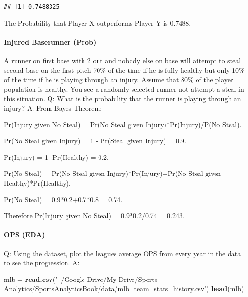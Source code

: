 \documentclass[]{article}
\newenvironment{Shaded}{\begin{snugshade}}{\end{snugshade}}
\newcommand{\KeywordTok}[1]{\textcolor[rgb]{0.13,0.29,0.53}{\textbf{#1}}}
\newcommand{\NormalTok}[1]{#1}
\newcommand{\StringTok}[1]{\textcolor[rgb]{0.31,0.60,0.02}{#1}}
\let\oldparagraph\paragraph
\renewcommand{\paragraph}[1]{\oldparagraph{#1}\mbox{}}
\begin{document}
\begin{verbatim}
## [1] 0.7488325
\end{verbatim}

The Probability that Player X outperforms Player Y is 0.7488.

\hypertarget{injured-baserunner-prob}{%
\paragraph{Injured Baserunner (Prob)}\label{injured-baserunner-prob}}

A runner on first base with 2 out and nobody else on base will attempt
to steal second base on the first pitch 70\% of the time if he is fully
healthy but only 10\% of the time if he is playing through an injury.
Assume that 80\% of the player population is healthy. You see a randomly
selected runner not attempt a steal in this situation. Q: What is the
probability that the runner is playing through an injury? A: From Bayes
Theorem:

Pr(Injury given No Steal) = Pr(No Steal given Injury)*Pr(Injury)/P(No
Steal).

Pr(No Steal given Injury) = 1 - Pr(Steal given Injury) = 0.9.

Pr(Injury) = 1- Pr(Healthy) = 0.2.

Pr(No Steal) = Pr(No Steal given Injury)*Pr(Injury)+Pr(No Steal given
Healthy)*Pr(Healthy).

Pr(No Steal) = 0.9*0.2+0.7*0.8 = 0.74.

Therefore Pr(Injury given No Steal) = 0.9*0.2/0.74 = 0.243.

\hypertarget{ops-eda}{%
\paragraph{OPS (EDA)}\label{ops-eda}}

Q: Using the dataset, plot the leagues average OPS from every year in
the data to see the progression. A:

\begin{Shaded}
\begin{Highlighting}[]
\NormalTok{mlb =}\StringTok{ }\KeywordTok{read.csv}\NormalTok{(}\StringTok{'~/Google Drive/My Drive/Sports Analytics/SportsAnalyticsBook/data/mlb_team_stats_history.csv'}\NormalTok{)}
\KeywordTok{head}\NormalTok{(mlb)}
\end{Highlighting}
\end{Shaded}
\end{document}
